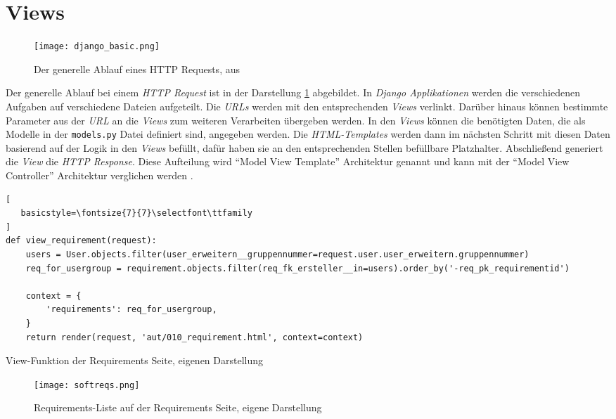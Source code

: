 \documentclass[11pt,a4paper]{report}
\begin{document}
\section{Views}
\label{iviews}

\begin{figure}[htpb]
  \centering
  \texttt{[image: django\_basic.png]}
  \caption{Der generelle Ablauf eines HTTP Requests, aus \cite{mozillatuto1}}
  \label{f:django_basic}
\end{figure}

Der generelle Ablauf bei einem \textit{HTTP Request} ist in der Darstellung \ref{f:django_basic} abgebildet. In \textit{Django Applikationen} werden die verschiedenen Aufgaben auf verschiedene Dateien aufgeteilt. Die \textit{URLs} werden mit den entsprechenden \textit{Views} verlinkt. Darüber hinaus können bestimmte Parameter aus der \textit{URL} an die \textit{Views} zum weiteren Verarbeiten übergeben werden. In den \textit{Views} können die benötigten Daten, die als Modelle in der \verb|models.py| Datei definiert sind, angegeben werden. Die \textit{HTML-Templates} werden dann im nächsten Schritt mit diesen Daten basierend auf der Logik in den \textit{Views} befüllt, dafür haben sie an den entsprechenden Stellen befüllbare Platzhalter. Abschließend generiert die \textit{View} die \textit{HTTP Response}. Diese Aufteilung wird "`Model View Template"' Architektur genannt \cite{mozillatuto1} und kann mit der "`Model View Controller"' Architektur verglichen werden \cite{mvc}.


\begin{listing}[htbp]
\begin{lstlisting}[
   basicstyle=\fontsize{7}{7}\selectfont\ttfamily
]
def view_requirement(request):
    users = User.objects.filter(user_erweitern__gruppennummer=request.user.user_erweitern.gruppennummer)
    req_for_usergroup = requirement.objects.filter(req_fk_ersteller__in=users).order_by('-req_pk_requirementid')

    context = {
        'requirements': req_for_usergroup,
    }
    return render(request, 'aut/010_requirement.html', context=context)
\end{lstlisting}
\caption{View-Funktion der Requirements Seite, eigenen Darstellung}
\label{code:allrequirements}
\end{listing}




\begin{figure}[htpb]
  \centering
  \texttt{[image: softreqs.png]}
  \caption{Requirements-Liste auf der Requirements Seite, eigene Darstellung}
  \label{f:softreqs}
\end{figure}
\end{document}
